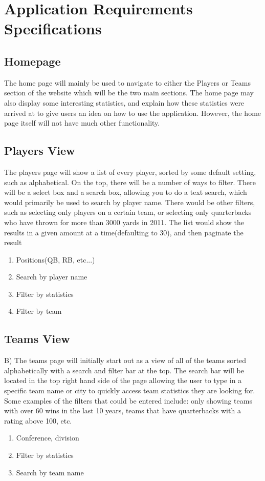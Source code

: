 \documentclass[12pt,letterpaper]{article}
\begin{document}
\section{Application Requirements Specifications}

\subsection{Homepage}
The home page will mainly be used to navigate to either the Players or Teams section of the website which will be the two main sections. The home page may also display some interesting statistics, and explain how these statistics were arrived at to give users an idea on how to use the application. However, the home page itself will not have much other functionality.

\subsection{Players View}
The players page will show a list of every player, sorted by some default setting, such as alphabetical. On the top, there will be a number of ways to filter. There will be a select box and a search box, allowing you to do a text search, which would primarily be used to search by player name.  There would be other filters, such as selecting only players on a certain team, or selecting only quarterbacks who have thrown for more than 3000 yards in 2011. The list would show the results in a given amount at a time(defaulting to 30), and then paginate the result
\begin{enumerate} 
\item Positions(QB, RB, etc...)
\item Search by player name
\item Filter by statistics
\item Filter by team
\end{enumerate}

\subsection{Teams View}
B) The teams page will initially start out as a view of all of the teams sorted alphabetically with a search and filter bar at the top. The search bar will be located in the top right hand side of the page allowing the user to type in a specific team name or city to quickly access team statistics they are looking for.  Some examples of the filters that could be entered include: only showing teams with over 60 wins in the last 10 years, teams that have quarterbacks with a rating above 100, etc.  
\begin{enumerate}
\item Conference, division
\item Filter by statistics
\item Search by team name
\end{enumerate}
\end{document}
